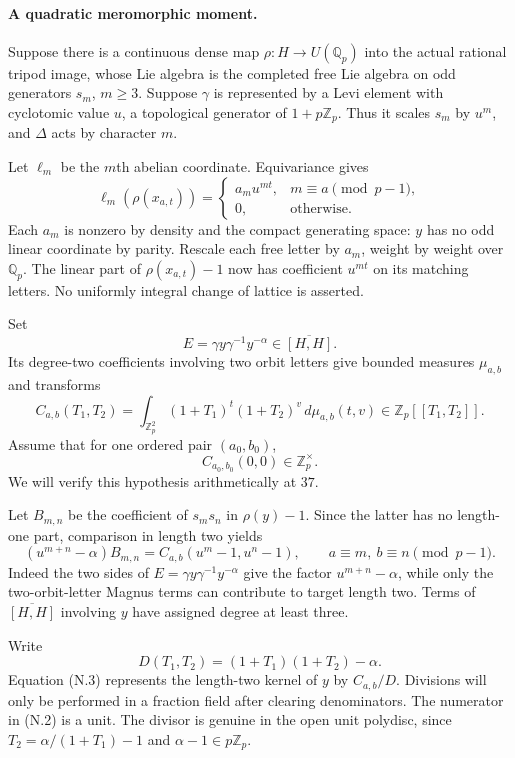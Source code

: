 \documentclass[11pt,a4paper]{article}
\theoremstyle{definition}
\begin{document}
\paragraph{A quadratic meromorphic moment.}
Suppose there is a continuous dense map $\rho:H\to U(\mathbb Q_p)$ into the actual rational tripod image, whose Lie algebra is the completed free Lie algebra on odd generators $s_m$, $m\ge3$. Suppose $\gamma$ is represented by a Levi element with cyclotomic value $u$, a topological generator of $1+p\mathbb Z_p$. Thus it scales $s_m$ by $u^m$, and $\Delta$ acts by character $m$.

Let $\ell_m$ be the $m$th abelian coordinate. Equivariance gives
\[
 \ell_m(\rho(x_{a,t}))=
 \begin{cases}a_m u^{mt},&m\equiv a\pmod{p-1},\\0,&\text{otherwise}.
 \end{cases}
\]
Each $a_m$ is nonzero by density and the compact generating space: $y$ has no odd linear coordinate by parity. Rescale each free letter by $a_m$, weight by weight over $\mathbb Q_p$. The linear part of $\rho(x_{a,t})-1$ now has coefficient $u^{mt}$ on its matching letters. No uniformly integral change of lattice is asserted.

Set
\[
 E=\gamma y\gamma^{-1}y^{-\alpha}\in\overline{[H,H]}.
\]
Its degree-two coefficients involving two orbit letters give bounded measures $\mu_{a,b}$ and transforms
\[
 C_{a,b}(T_1,T_2)=
 \int_{\mathbb Z_p^2}(1+T_1)^t(1+T_2)^v\,d\mu_{a,b}(t,v)
 \in\mathbb Z_p[[T_1,T_2]].
\]
Assume that for one ordered pair $(a_0,b_0)$,
\[
 C_{a_0,b_0}(0,0)\in\mathbb Z_p^\times.                         \tag{N.2}
\]
We will verify this hypothesis arithmetically at $37$.

Let $B_{m,n}$ be the coefficient of $s_ms_n$ in $\rho(y)-1$. Since the latter has no length-one part, comparison in length two yields
\[
 (u^{m+n}-\alpha)B_{m,n}
   =C_{a,b}(u^m-1,u^n-1),\qquad a\equiv m,\ b\equiv n\pmod{p-1}.
                                                                    \tag{N.3}
\]
Indeed the two sides of $E=\gamma y\gamma^{-1}y^{-\alpha}$ give the factor $u^{m+n}-\alpha$, while only the two-orbit-letter Magnus terms can contribute to target length two. Terms of $\overline{[H,H]}$ involving $y$ have assigned degree at least three.

Write
\[
 D(T_1,T_2)=(1+T_1)(1+T_2)-\alpha.
\]
Equation (N.3) represents the length-two kernel of $y$ by $C_{a,b}/D$. Divisions will only be performed in a fraction field after clearing denominators. The numerator in (N.2) is a unit. The divisor is genuine in the open unit polydisc, since $T_2=\alpha/(1+T_1)-1$ and $\alpha-1\in p\mathbb Z_p$.
\end{document}
